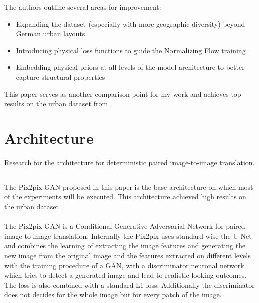 			The authors outline several areas for improvement:
			\begin{itemize}
				\item Expanding the dataset (especially with more geographic diversity) beyond German urban layouts
				\item Introducing physical loss functions to guide the Normalizing Flow training
				\item Embedding physical priors at all levels of the model architecture to better capture structural properties
			\end{itemize}
			This paper serves as another comparison point for my work and achieves top results on the urban dataset from \cite{spitznagel_urban_2024-1}.
		
	
	
	\newpage
	\section{Architecture}
	\label{sec:lit-architecture}
		Research for the architecture for deterministic paired image-to-image translation.
		
		\subsection{}
			The Pix2pix GAN proposed in this paper is the base architecture on which most of the experiments will be executed. This architecture achieved high results on the urban dataset \cite{spitznagel_urban_2024-1}.\\
			\\
			The Pix2pix GAN is a Conditional Generative Adversarial Network for paired image-to-image translation. Internally the Pix2pix uses standard-wise the U-Net \cite{ronneberger_u-net_2015} and combines the learning of extracting the image features and generating the new image from the original image and the features extracted on different levels with the training procedure of a GAN, with a discriminator neuronal network which tries to detect a generated image and lead to realistic looking outcomes. The loss is also combined with a standard L1 loss. Additionally the discriminator does not decides for the whole image but for every patch of the image.
			
